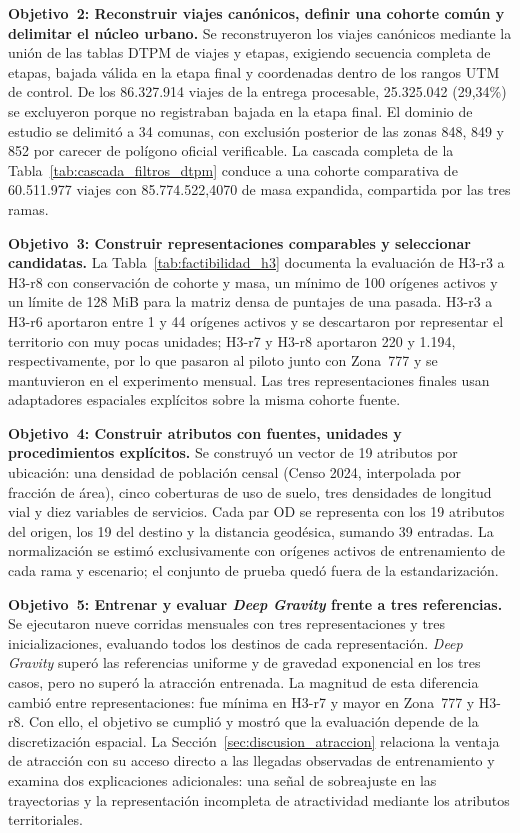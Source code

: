 \textbf{Objetivo~2: Reconstruir viajes canónicos, definir una cohorte común y delimitar el núcleo urbano.} Se reconstruyeron los viajes canónicos mediante la unión de las tablas DTPM de viajes y etapas, exigiendo secuencia completa de etapas, bajada válida en la etapa final y coordenadas dentro de los rangos UTM de control. De los 86.327.914 viajes de la entrega procesable, 25.325.042 (29,34\%) se excluyeron porque no registraban bajada en la etapa final. El dominio de estudio se delimitó a 34 comunas, con exclusión posterior de las zonas 848, 849 y 852 por carecer de polígono oficial verificable. La cascada completa de la Tabla~\ref{tab:cascada_filtros_dtpm} conduce a una cohorte comparativa de 60.511.977 viajes con 85.774.522,4070 de masa expandida, compartida por las tres ramas.

\textbf{Objetivo~3: Construir representaciones comparables y seleccionar candidatas.} La Tabla~\ref{tab:factibilidad_h3} documenta la evaluación de H3-r3 a H3-r8 con conservación de cohorte y masa, un mínimo de 100 orígenes activos y un límite de 128 MiB para la matriz densa de puntajes de una pasada. H3-r3 a H3-r6 aportaron entre 1 y 44 orígenes activos y se descartaron por representar el territorio con muy pocas unidades; H3-r7 y H3-r8 aportaron 220 y 1.194, respectivamente, por lo que pasaron al piloto junto con Zona~777 y se mantuvieron en el experimento mensual. Las tres representaciones finales usan adaptadores espaciales explícitos sobre la misma cohorte fuente.

\textbf{Objetivo~4: Construir atributos con fuentes, unidades y procedimientos explícitos.} Se construyó un vector de 19 atributos por ubicación: una densidad de población censal (Censo 2024, interpolada por fracción de área), cinco coberturas de uso de suelo, tres densidades de longitud vial y diez variables de servicios. Cada par OD se representa con los 19 atributos del origen, los 19 del destino y la distancia geodésica, sumando 39 entradas. La normalización se estimó exclusivamente con orígenes activos de entrenamiento de cada rama y escenario; el conjunto de prueba quedó fuera de la estandarización.

\textbf{Objetivo~5: Entrenar y evaluar \textit{Deep Gravity} frente a tres referencias.} Se ejecutaron nueve corridas mensuales con tres representaciones y tres inicializaciones, evaluando todos los destinos de cada representación. \textit{Deep Gravity} superó las referencias uniforme y de gravedad exponencial en los tres casos, pero no superó la atracción entrenada. La magnitud de esta diferencia cambió entre representaciones: fue mínima en H3-r7 y mayor en Zona~777 y H3-r8. Con ello, el objetivo se cumplió y mostró que la evaluación depende de la discretización espacial. La Sección~\ref{sec:discusion_atraccion} relaciona la ventaja de atracción con su acceso directo a las llegadas observadas de entrenamiento y examina dos explicaciones adicionales: una señal de sobreajuste en las trayectorias y la representación incompleta de atractividad mediante los atributos territoriales.

